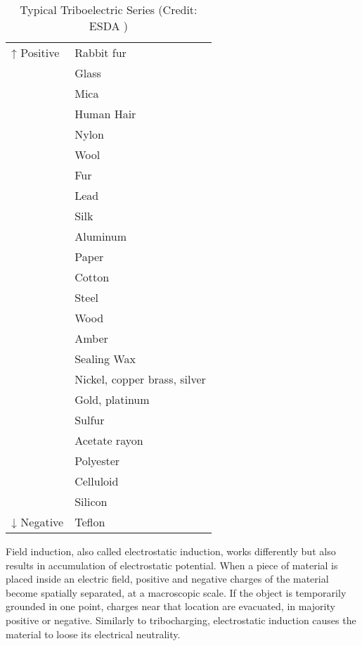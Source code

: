 \begin{table}[!h]
\centering
\begin{tabular}{@{}ll@{}}
\toprule
↑ Positive & Rabbit fur     \\
           & Glass          \\
           & Mica           \\
           & Human Hair     \\
           & Nylon          \\
           & Wool           \\
           & Fur            \\
           & Lead           \\
           & Silk           \\
           & Aluminum       \\ \midrule
           & Paper          \\
           & Cotton         \\
           & Steel          \\
           & Wood           \\
           & Amber          \\
           & Sealing Wax    \\
           & Nickel, copper brass, silver \\
           & Gold, platinum \\
           & Sulfur         \\
           & Acetate rayon  \\
           & Polyester      \\
           & Celluloid      \\
           & Silicon        \\
↓ Negative & Teflon         \\
\bottomrule
\end{tabular}
\caption{Typical Triboelectric Series (Credit: ESDA \cite{esda-triboseries})}
\label{tab:chargin-sign-table}
\end{table}

Field induction, also called electrostatic induction, works differently but also results in accumulation of electrostatic potential.
When a piece of material is placed inside an electric field, positive and negative charges of the material become spatially separated, at a macroscopic scale.
If the object is temporarily grounded in one point, charges near that location are evacuated, in majority positive or negative.
Similarly to tribocharging, electrostatic induction causes the material to loose its electrical neutrality.

